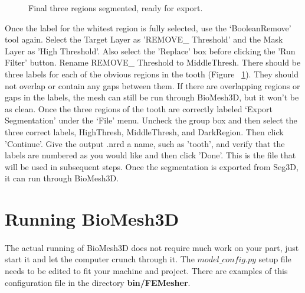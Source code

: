 \documentclass[fleqn,12pt,openany]{book}
\begin{document}
\begin{figure}
\caption{\label{fig:tooth_3types} Final three regions segmented, ready for export.}
\end{figure} 

Once the label for the whitest region is fully selected, use the `BooleanRemove' tool again.  
Select the Target Layer as 'REMOVE\_ Threshold' and the Mask Layer as 'High Threshold'. Also
select the 'Replace' box before clicking the 'Run Filter' button. Rename REMOVE\_ Threshold to MiddleThresh. There should be three labels for each of the obvious regions in the tooth (Figure ~\ref{fig:tooth_3types}).
They should not overlap or contain any gaps between them.
If there are overlapping regions or gaps in the labels, the mesh can still 
be run through BioMesh3D, but it won't be as clean.
Once the three regions of 
the tooth are correctly labeled `Export Segmentation' under the `File' menu.
Uncheck the group box and then select the three correct labels, HighThresh, MiddleThresh, and DarkRegion. Then click 'Continue'. Give the output .nrrd a name, such as 'tooth', and verify that the labels are numbered as you would like and then click 'Done'.
This is the file that will be used in subsequent steps. Once the segmentation 
is exported from Seg3D, it can run through BioMesh3D.


 

\section{Running BioMesh3D}

\paragraph{}
The actual running of BioMesh3D does not require much work on your part, just 
start it and let the computer crunch through it. The $model\_config.py$ setup 
file needs to be edited to fit your machine and project. There are examples 
of this configuration file in the directory \textbf{bin/FEMesher}.
\newline
 
\end{document}
